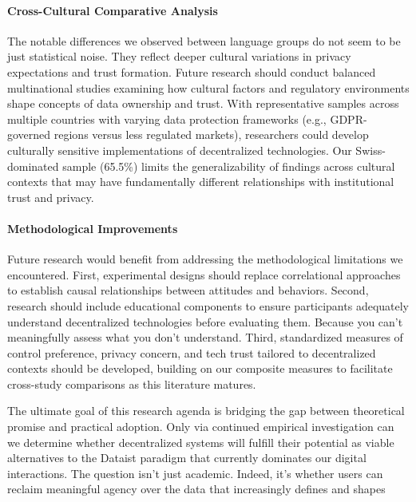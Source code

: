 	\paragraph{Cross-Cultural Comparative Analysis}
	The notable differences we observed between language groups do not seem to be just statistical noise. They reflect deeper cultural variations in privacy expectations and trust formation. Future research should conduct balanced multinational studies examining how cultural factors and regulatory environments shape concepts of data ownership and trust. With representative samples across multiple countries with varying data protection frameworks (e.g., GDPR-governed regions versus less regulated markets), researchers could develop culturally sensitive implementations of decentralized technologies. Our Swiss-dominated sample (65.5\%) limits the generalizability of findings across cultural contexts that may have fundamentally different relationships with institutional trust and privacy.
	
	\paragraph{Methodological Improvements}
	Future research would benefit from addressing the methodological limitations we encountered. First, experimental designs should replace correlational approaches to establish causal relationships between attitudes and behaviors. Second, research should include educational components to ensure participants adequately understand decentralized technologies before evaluating them. Because you can't meaningfully assess what you don't understand. Third, standardized measures of control preference, privacy concern, and tech trust tailored to decentralized contexts should be developed, building on our composite measures to facilitate cross-study comparisons as this literature matures.
	
	The ultimate goal of this research agenda is bridging the gap between theoretical promise and practical adoption. Only via  continued empirical investigation can we determine whether decentralized systems will fulfill their potential as viable alternatives to the Dataist paradigm that currently dominates our digital interactions. The question isn't just academic. Indeed, it's whether users can reclaim meaningful agency over the data that increasingly defines and shapes

